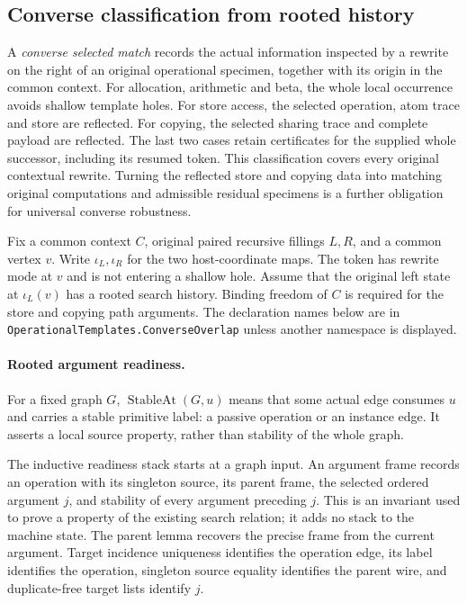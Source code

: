 
\subsection{Converse classification from rooted history}
A \emph{converse selected match} records the actual information inspected by a
rewrite on the right of an original operational specimen, together with its
origin in the common context. For allocation, arithmetic and beta, the whole
local occurrence avoids shallow template holes. For store access, the selected
operation, atom trace and store are reflected. For copying, the selected
sharing trace and complete payload are reflected. The last two cases retain
certificates for the supplied whole successor, including its resumed token.
This classification covers every original contextual rewrite. Turning the
reflected store and copying data into matching original computations and
admissible residual specimens is a further obligation for universal converse
robustness.

Fix a common context $C$, original paired recursive fillings $L,R$, and a
common vertex $v$. Write $\iota_L,\iota_R$ for the two host-coordinate maps.
The token has rewrite mode at $v$ and is not entering a shallow hole. Assume
that the original left state at $\iota_L(v)$ has a rooted search history.
Binding freedom of $C$ is required for the store and copying path arguments.
The declaration names below are in \texttt{OperationalTemplates.ConverseOverlap}
unless another namespace is displayed.

\paragraph{Rooted argument readiness.}
For a fixed graph $G$, $\operatorname{StableAt}(G,u)$ means that some actual
edge consumes $u$ and carries a stable primitive label: a passive operation
or an instance edge. It asserts a local source property, rather than stability
of the whole graph.

The inductive readiness stack starts at a graph input. An argument frame
records an operation with its singleton source, its parent frame, the selected
ordered argument $j$, and stability of every argument preceding $j$. This is
an invariant used to prove a property of the existing search relation; it
adds no stack to the machine state. The parent lemma recovers the precise
frame from the current argument. Target incidence uniqueness identifies the
operation edge, its label identifies the operation, singleton source equality
identifies the parent wire, and duplicate-free target lists identify $j$.

